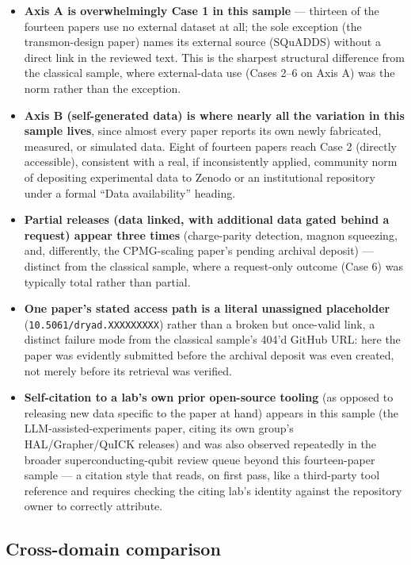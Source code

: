 \documentclass[11pt]{article}
\begin{document}
\begin{itemize}[leftmargin=1.5em]
    \item \textbf{Axis A is overwhelmingly Case 1 in this sample} --- thirteen of the
    fourteen papers use no external dataset at all; the sole exception (the
    transmon-design paper) names its external source (SQuADDS) without a direct link in
    the reviewed text. This is the sharpest structural difference from the classical
    sample, where external-data use (Cases 2--6 on Axis A) was the norm rather than the
    exception.
    \item \textbf{Axis B (self-generated data) is where nearly all the variation in this
    sample lives}, since almost every paper reports its own newly fabricated,
    measured, or simulated data. Eight of fourteen papers reach Case 2 (directly
    accessible), consistent with a real, if inconsistently applied, community norm of
    depositing experimental data to Zenodo or an institutional repository under a
    formal ``Data availability'' heading.
    \item \textbf{Partial releases (data linked, with additional data gated behind a
    request) appear three times} (charge-parity detection, magnon squeezing, and,
    differently, the CPMG-scaling paper's pending archival deposit) --- distinct from
    the classical sample, where a request-only outcome (Case 6) was typically total
    rather than partial.
    \item \textbf{One paper's stated access path is a literal unassigned placeholder}
    (\texttt{10.5061/dryad.XXXXXXXXX}) rather than a broken but once-valid link, a
    distinct failure mode from the classical sample's 404'd GitHub URL: here the paper
    was evidently submitted before the archival deposit was even created, not merely
    before its retrieval was verified.
    \item \textbf{Self-citation to a lab's own prior open-source tooling} (as opposed to
    releasing new data specific to the paper at hand) appears in this sample (the
    LLM-assisted-experiments paper, citing its own group's HAL/Grapher/QuICK releases)
    and was also observed repeatedly in the broader superconducting-qubit review queue
    beyond this fourteen-paper sample --- a citation style that reads, on first pass, like
    a third-party tool reference and requires checking the citing lab's identity against
    the repository owner to correctly attribute.
\end{itemize}

\subsection{Cross-domain comparison}
\end{document}
